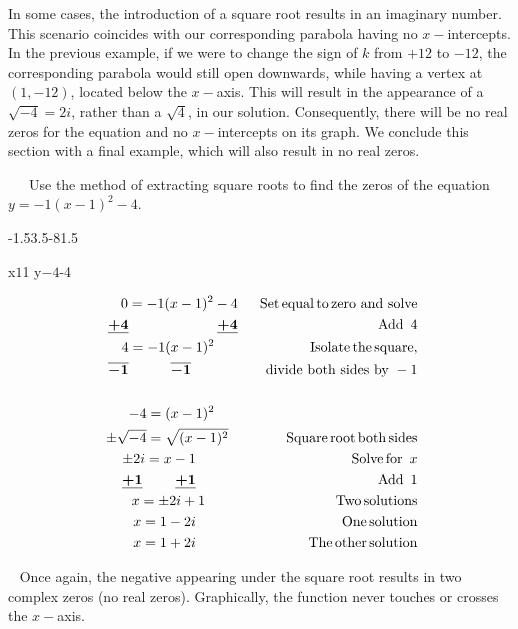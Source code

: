 In some cases, the introduction of a square root results in an imaginary number.  This scenario coincides with our corresponding parabola having no $x-$intercepts.  In the previous example, if we were to change the sign of $k$ from $+12$ to $-12$, the corresponding parabola would still open downwards, while having a vertex at $(1,-12)$, located below the $x-$axis.  This will result in the appearance of a $\sqrt{-4}=2i$, rather than a $\sqrt{4}$, in our solution.  Consequently, there will be no real zeros for the equation and no $x-$intercepts on its graph.\pp
We conclude this section with a final example, which will also result in no real zeros.

\begin{example}~~~Use the method of extracting square roots to find the zeros of the equation $y = -1(x-1)^2-4$.\\

\begin{vwcol}[widths={0.25,0.75},sep=.5cm, justify=flush,rule=0pt,indent=1em]
\begin{mfpic}%
[14]{-1.5}{3.5}{-8}{1.5}
\arrow \reverse \arrow {}
\axes
{}

\axislabels x{{$1$}1}
\axislabels y{{$-4$}-4}%
\end{mfpic}

\begin{eqnarray*}
    \ 0 = -1(x-1)^2-4 &  &  \operatorname{Set} \operatorname{equal} \operatorname{to} \operatorname{zero~and~solve}\\
    \ \boldsymbol{\underline{+4}~~~~~~~~~~~~~~~~~~~\underline{+4}}   & & \operatorname{Add~}4\\
		\ 4 = -1(x-1)^2~~~~~ & &  \operatorname{Isolate} \operatorname{the} \operatorname{square,}\\
		\ \boldsymbol{\overline{-1}~~~~~~~~~\overline{-1}}~~~~~~~~~~ & & ~~~\text{divide~both~sides~by~}-1\\
		&&\\
		-4 = (x-1)^2~~~~~&&\\
    \ \pm\sqrt{-4} = \sqrt{(x-1)^2}~~ & & \operatorname{Square} \operatorname{root} \operatorname{both} \operatorname{sides}\\
		\ \pm2i = x - 1~~~~~~~~~& &  \operatorname{Solve} \operatorname{for~}x\\
		\ \boldsymbol{\underline{+1}~~~~~~~\underline{+1}}~~~~~~~~~  & &  \operatorname{Add~}1\\
		\ x=\pm2i +1~~~~~~~ & & \operatorname{Two} \operatorname{solutions} \\
		\ x=1 - 2i~~~~~~~~~ & & \operatorname{One} \operatorname{solution}\\
		\ x=1 + 2i~~~~~~~~~ & & \operatorname{The} \operatorname{other} \operatorname{solution}
  \end{eqnarray*}
\end{vwcol}
\end{example}
~\pp
Once again, the negative appearing under the square root results in two complex zeros (no real zeros).  Graphically, the function never touches or crosses the $x-$axis.
